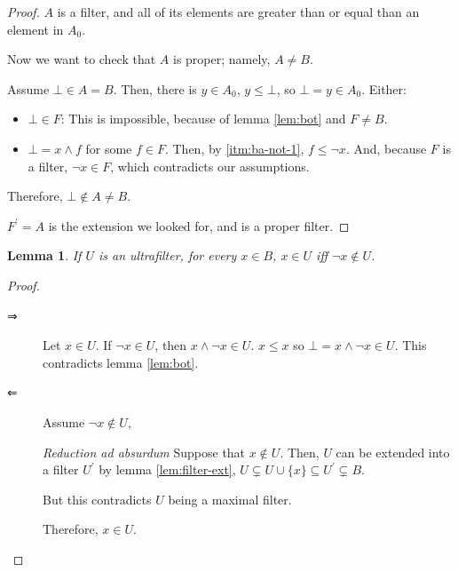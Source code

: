 \documentclass[notitlepage,a4paper]{article}
\newtheorem{lemma}{Lemma}
\begin{document}
\begin{enumerate}
\begin{proof}
           $A$ is a filter, and all of its elements are greater than or
           equal than an element in $A_0$.
           
           Now we want to check that $A$ is proper; namely, $A ≠ B$.

           Assume $⊥ \in A = B$. Then, there is $y \in A_0$, $y ≤ ⊥$,
           so $⊥ = y \in A_0$. Either:

           \begin{itemize}
             \item $⊥ \in F$: This is impossible, because of lemma \ref{lem:bot} and $F \neq B$.
             \item $⊥ = x ∧ f$ for some $f ∈ F$. Then, by \ref{itm:ba-not-1},
               $f ≤ ¬x$. And, because $F$ is a filter,
               $¬x \in F$, which contradicts our assumptions.
           \end{itemize}

           Therefore, $⊥ \not \in A ≠ B$.

           $F^\prime = A$ is the extension we looked for, and is a proper filter.
           
     \end{proof}
     
     \begin{lemma}\label{lem:neg}
       If $U$ is an ultrafilter, for every $x ∈ B$,
       $x ∈ U$ iff $¬x \not \in U$.
     \end{lemma}
     \begin{proof}

       \begin{description}
         
         \item[⇒] Let $x ∈ U$. If $¬x ∈ U$, then $x ∧ ¬x ∈ U$.
           $x ≤ x$ so $⊥ = x ∧ ¬x ∈ U$. This contradicts lemma \ref{lem:bot}.

         \item[⇐] Assume $¬x \not \in U$,

           {\em Reduction ad absurdum} Suppose that $x \not \in U$. Then,
           $U$ can be extended into a filter $U^\prime$ by lemma \ref{lem:filter-ext},
           $U \subsetneq U \cup \{x\} \subseteq U^\prime \subsetneq B$.
           
           But this contradicts $U$ being a maximal filter.
           
           Therefore, $x \in U$.
            
        \end{description}
    \end{proof}


\end{enumerate}
\end{document}
